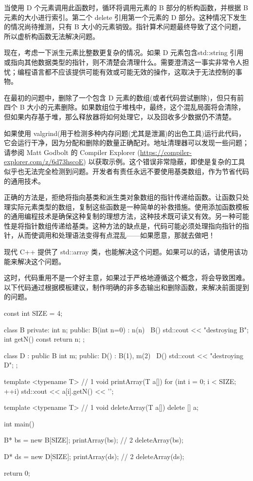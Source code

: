 当使用 D 个元素调用此函数时，循环将调用元素的 B 部分的析构函数，并根据 B 元素的大小进行索引。第二个 delete 引用第一个元素的 D 部分。这种情况下发生的情况尚待推测，只有 B 大小的元素销毁。指针算术问题最终导致了这个问题，所以虚析构函数无法解决问题。

现在，考虑一下派生元素比整数更复杂的情况。如果 D 元素包含std::string 引用或指向其他数据类型的指针，则不清楚会清理什么。需要澄清这一事实非常令人担忧；编程语言都不应该提供可能有效或可能无效的操作，这取决于无法控制的事物。

在最初的问题中，删除了一个包含 D 元素的数组(或者代码尝试删除)，但只有前四个 B 大小的元素删除。如果数组位于堆栈中，最终，这个混乱局面将会清除，但如果内存基于堆，那么释放器将如何处理它，以及回收多少数据仍不清楚。

如果使用 valgrind(用于检测多种内存问题(尤其是泄漏)的出色工具)运行此代码，它会运行干净，因为分配和删除的数量正确配对。地址清理器可以发现一些问题；请参阅 Matt Godbolt 的 Compiler Explorer (\url{https://compiler-explorer.com/z/6d73hscoE}) 以获取示例。这个错误非常隐蔽，即使是复杂的工具似乎也无法完全检测到问题。开发者有责任永远不要使用基类数组，作为节省代码的通用技术。


正确的方法是，拒绝将指向基类和派生类对象数组的指针传递给函数。让函数只处理实际元素类型的数组，复制这些函数是一种简单的补救措施。使用添加函数模板的通用编程技术是确保这种复制的理想方法，这种技术既可读又有效。另一种可能性是将指针数组传递给基类。这种方法的缺点是，代码可能必须处理指向指针的指针，从而使调用和处理语法变得有点混乱——如果愿意，那就去做吧！

现代 C++ 提供了 std::array 类，也能解决这个问题。如果可以的话，请使用该功能来解决这个问题。

这时，代码重用不是一个好主意，如果过于严格地遵循这个概念，将会导致困难。以下代码通过根据模板建议，制作明确的非多态输出和删除函数，来解决前面提到的问题。


\begin{cpp}
const int SIZE = 4;

class B {
private:
  int n;
public:
  B(int n=0) : n(n) {}
  ~B() { std::cout << "destroying B\n"; }
  int getN() const { return n; }
};

class D : public B {
  int m;
public:
  D() : B(1), m(2) {}
  ~D() { std::cout << "destroying D\n"; }
};

template <typename T> // 1
void printArray(T a[]) {
  for (int i = 0; i < SIZE; ++i)
    std::cout << a[i].getN() << '\n';
}

template <typename T> // 1
void deleteArray(T a[]) {
  delete [] a;
}

int main() {
  B* bs = new B[SIZE];
  printArray(bs); // 2
  deleteArray(bs);

  D* ds = new D[SIZE];
  printArray(ds); // 2
  deleteArray(ds);

  return 0;
}
\end{cpp}

